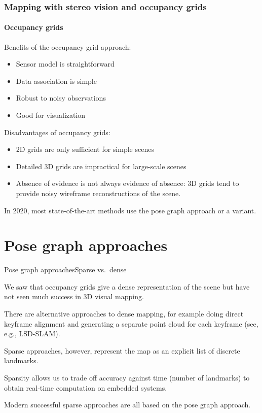 \documentclass[aspectratio=169]{beamer}
\begin{document}
\begin{frame}
\frametitle{Mapping with stereo vision and occupancy grids}
\framesubtitle{Occupancy grids}

Benefits of the occupancy grid approach:
\begin{itemize}
\item Sensor model is straightforward
\item Data association is simple
\item Robust to noisy observations
\item Good for visualization
\end{itemize}

\medskip

Disadvantages of occupancy grids:
\begin{itemize}
\item 2D grids are only sufficient for simple scenes
\item Detailed 3D grids are impractical for large-scale scenes
\item Absence of evidence is not always evidence of absence: 3D grids
  tend to provide noisy wireframe reconstructions of the scene.
\end{itemize}

\medskip

In 2020, most state-of-the-art methods use the \alert{pose graph}
approach or a variant.

\end{frame}

\section{Pose graph approaches}

\begin{frame}{Pose graph approaches}{Sparse vs.\ dense}

  We saw that occupancy grids give a \alert{dense} representation
  of the scene but have not seen much success in 3D visual mapping.

  \medskip

  There are alternative approaches to dense mapping, for example doing
  \alert{direct keyframe alignment} and generating a separate point
  cloud for each keyframe (see, e.g., LSD-SLAM).

  \medskip

  \alert{Sparse} approaches, however, represent the map as an explicit
  list of discrete landmarks.

  \medskip

  Sparsity allows us to trade off accuracy against time (number of
  landmarks) to obtain real-time computation on embedded systems.

  \medskip

  Modern successful sparse approaches are all based on the \alert{pose
    graph} approach.
  
\end{frame}
\end{document}
